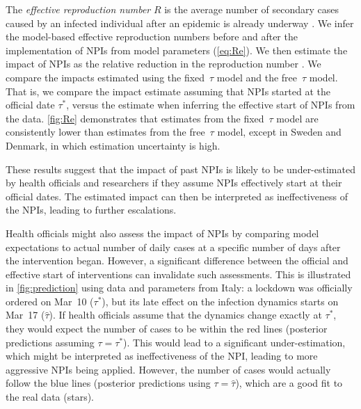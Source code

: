 \documentclass[12pt]{extarticle}
\begin{document}
The \emph{effective reproduction number} $R$ is the average number of secondary
cases caused by an infected individual after an epidemic is already underway \citep{Bar-On2020a}.
We infer the model-based effective reproduction numbers before and after the implementation of NPIs from model parameters (\autoref{eq:Re}).
We then estimate the impact of NPIs as the relative reduction in the reproduction number \citep{Flaxman2020}. 
We compare the impacts estimated using the fixed~$\tau$ model and the free~$\tau$ model.
That is, we compare the impact estimate assuming that NPIs started at the official date $\tau^*$, versus the estimate when inferring the effective start of NPIs from the data.
\autoref{fig:Re} demonstrates that estimates from the fixed~$\tau$ model are consistently lower than estimates from the free~$\tau$ model, except in Sweden and Denmark, in which estimation uncertainty is high.  

These results suggest that the impact of past NPIs is likely to be under-estimated by health officials and researchers if they assume NPIs effectively start at their official dates.
The estimated impact can then be interpreted as ineffectiveness of the NPIs, leading to further escalations.

Health officials might also assess the impact of NPIs by comparing model expectations to actual number of daily cases at a specific number of days after the intervention began. 
However, a significant difference between the official and effective start of interventions can invalidate such assessments.
This is illustrated in \autoref{fig:prediction} using data and parameters from Italy: a lockdown was officially ordered on Mar~10 ($\tau^*$), but its late effect on the infection dynamics starts on Mar~17 ($\hat{\tau}$).
If health officials assume that the dynamics change exactly at $\tau^*$, they would expect the number of cases to be within the red lines (posterior predictions assuming $\tau=\tau^*$).
This would lead to a significant under-estimation, which might be interpreted as ineffectiveness of the NPI, leading to more aggressive NPIs being applied.
However, the number of cases would actually follow the blue lines (posterior predictions using $\tau=\hat{\tau}$), which are a good fit to the real data (stars).
\end{document}
